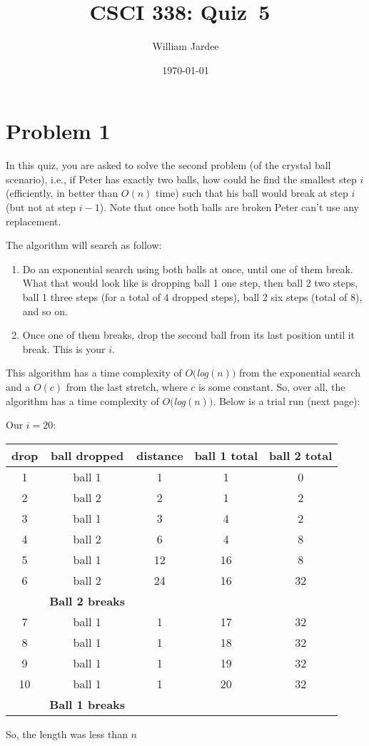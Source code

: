 \documentclass[11pt]{article}
\begin{document}
\graphicspath{{../images/}}

\title{CSCI 338: Quiz~5~}
\author{William Jardee}
\date{\today}
\maketitle


\section*{Problem 1}

    In this quiz, you are asked to solve the second problem (of the crystal ball scenario), i.e., if Peter has exactly two balls, how could he find the smallest step $i$ (efficiently, in better than $O(n)$ time) such that his ball would break at step $i$ (but not at step $i-1$). Note that once both balls are broken Peter can't use any replacement. 
    
    The algorithm will search as follow: 
    \begin{enumerate}
        \item Do an exponential search using both balls at once, until one of them break. What that would look like is dropping ball 1 one step, then ball 2 two steps, ball 1 three steps (for a total of 4 dropped steps), ball 2 six steps (total of 8), and so on. 
        \item Once one of them breaks, drop the second ball from its last position until it break. This is your $i$. 
    \end{enumerate}
    This algorithm has a time complexity of $O(${\em log}$(n))$ from the exponential search and a $O(c)$ from the last stretch, where $c$ is some constant. So, over all, the algorithm has a time complexity of $O(${\em log}$(n))$. Below is a trial run (next page):
    \newpage
    
    Our $i=20$:\\
    \begin{center}
    \begin{tabular}{c|c|c|c|c}
        drop & ball dropped & distance & ball 1 total & ball 2 total \\
        \hline
        1 & ball 1 & 1 & 1 & 0\\
        2 & ball 2 & 2 & 1 & 2\\
        3 & ball 1 & 3 & 4 & 2\\
        4 & ball 2 & 6 & 4 & 8\\
        5 & ball 1 & 12 & 16 & 8\\
        6 & ball 2 & 24 & 16 & 32\\
        & {\bf Ball 2 breaks}\\
        7 & ball 1 & 1 & 17 & 32\\
        8 & ball 1 & 1 & 18 & 32\\
        9 & ball 1 & 1 & 19 & 32\\
        10 & ball 1 & 1 & 20 & 32\\
        & {\bf Ball 1 breaks}\\
    \end{tabular}
    \end{center}
    
    So, the length was less than $n$
    
    
\end{document}
